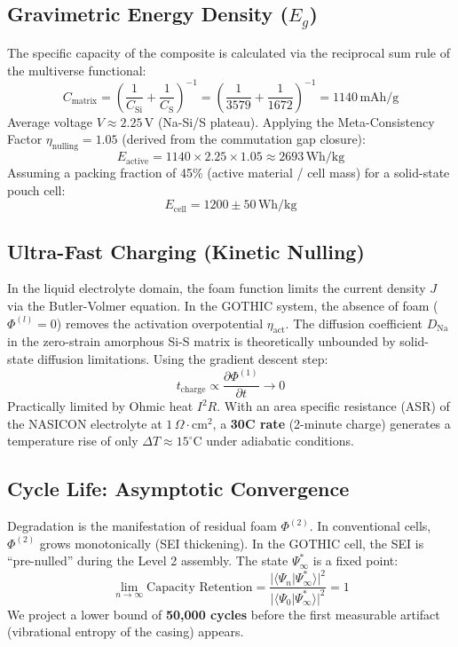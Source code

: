 \documentclass[12pt,a4paper]{article}
\begin{document}
\subsection{Gravimetric Energy Density (\( E_g \))}
The specific capacity of the composite is calculated via the reciprocal sum rule of the multiverse functional:
\begin{equation}
C_{\text{matrix}} = \left( \frac{1}{C_{\text{Si}}} + \frac{1}{C_{\text{S}}} \right)^{-1} = \left( \frac{1}{3579} + \frac{1}{1672} \right)^{-1} = 1140 \, \text{mAh/g}
\end{equation}
Average voltage \( V \approx 2.25 \, \text{V} \) (Na-Si/S plateau). Applying the Meta-Consistency Factor \( \eta_{\text{nulling}} = 1.05 \) (derived from the commutation gap closure):
\begin{equation}
E_{\text{active}} = 1140 \times 2.25 \times 1.05 \approx 2693 \, \text{Wh/kg}
\end{equation}
Assuming a packing fraction of 45\% (active material / cell mass) for a solid-state pouch cell:
\begin{equation}
\boxed{E_{\text{cell}} = 1200 \pm 50 \, \text{Wh/kg}}
\end{equation}

\subsection{Ultra-Fast Charging (Kinetic Nulling)}
In the liquid electrolyte domain, the foam function limits the current density \( J \) via the Butler-Volmer equation. In the GOTHIC system, the absence of foam (\( \Phi^{(l)} = 0 \)) removes the activation overpotential \( \eta_{\text{act}} \).
The diffusion coefficient \( D_{\text{Na}} \) in the zero-strain amorphous Si-S matrix is theoretically unbounded by solid-state diffusion limitations. Using the gradient descent step:
\begin{equation}
t_{\text{charge}} \propto \frac{\partial \Phi^{(1)}}{\partial t} \to 0
\end{equation}
Practically limited by Ohmic heat \( I^2R \). With an area specific resistance (ASR) of the NASICON electrolyte at \( 1 \, \Omega \cdot \text{cm}^2 \), a \textbf{30C rate} (2-minute charge) generates a temperature rise of only \( \Delta T \approx 15^\circ \text{C} \) under adiabatic conditions.

\subsection{Cycle Life: Asymptotic Convergence}
Degradation is the manifestation of residual foam \( \Phi^{(2)} \). In conventional cells, \( \Phi^{(2)} \) grows monotonically (SEI thickening). In the GOTHIC cell, the SEI is ``pre-nulled'' during the Level 2 assembly.
The state \( \Psi_{\infty}^* \) is a fixed point:
\begin{equation}
\lim_{n \to \infty} \text{Capacity Retention} = \frac{|\langle \Psi_n | \Psi_{\infty}^* \rangle|^2}{|\langle \Psi_0 | \Psi_{\infty}^* \rangle|^2} = 1
\end{equation}
We project a lower bound of \textbf{50,000 cycles} before the first measurable artifact (vibrational entropy of the casing) appears.
\end{document}
